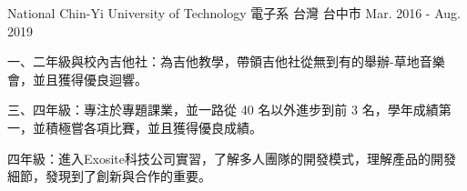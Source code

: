 

\begin{cventries}

  \cventry
    {National Chin-Yi University of Technology} %
    {電子系} %
    {台灣 台中市} %
    {Mar. 2016 - Aug. 2019} %
    {
      \begin{cvitems} %
        \item {一、二年級與校內吉他社：為吉他教學，帶領吉他社從無到有的舉辦-草地音樂會，並且獲得優良迴響。}
        \item {三、四年級：專注於專題課業，並一路從 40 名以外進步到前 3 名，學年成績第一，並積極嘗各項比賽，並且獲得優良成績。}
        \item {四年級：進入Exosite科技公司實習，了解多人團隊的開發模式，理解產品的開發細節，發現到了創新與合作的重要。}
      \end{cvitems}
    }

\end{cventries}
